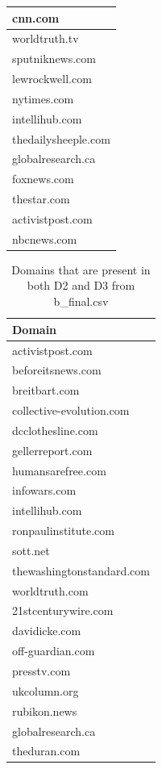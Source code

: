 \documentclass[12pt]{article}
\begin{document}
\begin{table}[ht]
\begin{tabular}{|l|}
cnn.com \\ \hline
worldtruth.tv \\ \hline
sputniknews.com \\ \hline
lewrockwell.com \\ \hline
nytimes.com \\ \hline
intellihub.com \\ \hline
thedailysheeple.com \\ \hline
globalresearch.ca \\ \hline
foxnews.com \\ \hline
thestar.com \\ \hline
activistpost.com \\ \hline
nbcnews.com \\ \hline
\end{tabular}
\end{table}

\begin{table}[ht]
\centering
\caption{Domains that are present in both D2 and D3 from b\_final.csv}
\label{tb4}
\begin{tabular}{|l|}
\hline
\textbf{Domain} \\ \hline \hline
activistpost.com\\ \hline
beforeitsnews.com\\ \hline
breitbart.com \\ \hline
collective-evolution.com \\ \hline
dcclothesline.com \\ \hline
gellerreport.com \\ \hline
humansarefree.com \\ \hline
infowars.com \\ \hline
intellihub.com \\ \hline
ronpaulinstitute.com \\ \hline
sott.net \\ \hline
thewashingtonstandard.com \\ \hline
worldtruth.com \\ \hline
21stcenturywire.com \\ \hline
davidicke.com \\ \hline
off-guardian.com \\ \hline
presstv.com \\ \hline
ukcolumn.org \\ \hline
rubikon.news \\ \hline
globalresearch.ca \\ \hline
theduran.com \\ \hline
\end{tabular}
\end{table}
\end{document}
